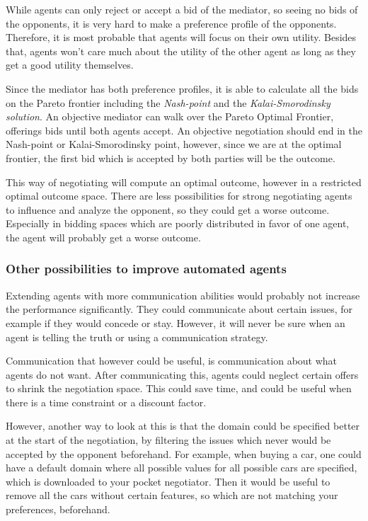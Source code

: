 While agents can only reject or accept a bid of the mediator, so seeing no bids of the opponents, it is very hard to make a preference profile of the opponents. Therefore, it is most probable that agents will focus on their own utility. Besides that, agents won't care much about the utility of the other agent as long as they get a good utility themselves. 

Since the mediator has both preference profiles, it is able to calculate all the bids on the Pareto frontier including the \emph{Nash-point} and the \emph{Kalai-Smorodinsky solution}. An objective mediator can walk over the Pareto Optimal Frontier, offerings bids until both agents accept. An objective negotiation should end in the Nash-point or Kalai-Smorodinsky point, however, since we are at the optimal frontier, the first bid which is accepted by both parties will be the outcome.

This way of negotiating will compute an optimal outcome, however in a restricted optimal outcome space. There are less possibilities for strong negotiating agents to influence and analyze the opponent, so they could get a worse outcome. Especially in bidding spaces which are poorly distributed in favor of one agent, the agent will probably get a worse outcome.

\subsubsection{Other possibilities to improve automated agents}
Extending agents with more communication abilities would probably not increase the performance significantly. They could
communicate about certain issues, for example if they would concede or stay. However, it will never be sure when an agent is telling the truth or using a communication strategy. 

Communication that however could be useful, is communication about what agents do not want. After communicating this, agents could neglect certain offers to shrink the negotiation space. This could save time, and could be useful when there is a time constraint or a discount factor. 

However, another way to look at this is that the domain could be specified better at the start of the negotiation, by filtering the issues which never would be accepted by the opponent beforehand. For example, when buying a car, one could have a default domain where all possible values for all possible cars are specified, which is 
downloaded to your pocket negotiator. Then it would be useful to remove all the cars without certain features, so which are not matching your preferences, beforehand. 

